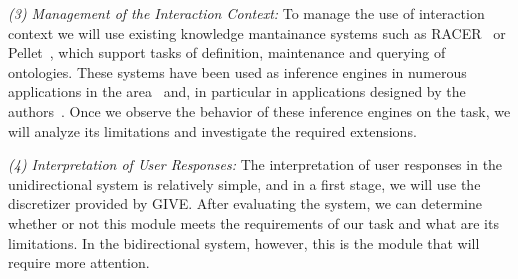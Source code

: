\emph{(3) Management of the Interaction Context:} To manage the use of
interaction context we will use existing knowledge mantainance systems such as
RACER~\cite{haar:race99} or Pellet~\cite{siri:pell06}, which support tasks of
definition, maintenance and querying of ontologies. These systems have been used
as inference engines in numerous applications in
the area~\cite{franconi03,koller04} and, in particular
in applications designed by the authors~\cite{benotti09b}. Once we
observe the behavior of these inference engines on the task, we will analyze
its limitations and investigate the required extensions.
% 

\emph{(4) Interpretation of User Responses:} The interpretation of user
responses in the unidirectional system is relatively simple, and in a first
stage, we will use the discretizer provided by GIVE. After evaluating the
system, we can determine whether or not this module meets the requirements of
our task and what are its limitations. In the bidirectional system, however,
this is the module that will require more attention.
% 


